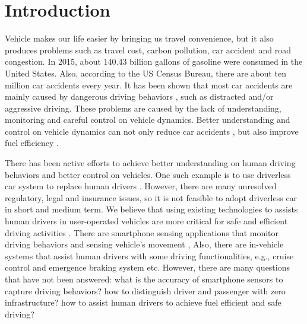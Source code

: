 
\chapter{Introduction}  %


Vehicle makes our life easier by bringing us travel convenience, 
but it also produces problems such as travel cost, carbon pollution, 
car accident and road congestion.
In 2015, about 140.43 billion gallons of gasoline were consumed in the United States. 
Also, according to the US Census Bureau, there are about ten million car accidents every year.
It has been shown that most car accidents are mainly 
caused by dangerous driving behaviors \cite{progressive}, such as distracted and/or aggressive driving.  
These problems are caused by the lack of understanding, monitoring 
and careful control on vehicle dynamics. 
Better understanding and control on vehicle dynamics
can not only reduce car accidents \cite{progressive}, 
but also improve fuel efficiency \cite{morganstanley2013}. 


There has been active efforts to achieve better understanding on
human driving behaviors and better control on vehicles. 
One such example is to use driverless car system to 
replace human drivers \cite{googledriverlesscar, kumar2012carspeak,
urmson2008autonomous,litman2013autonomous}. 
However, there are many unresolved regulatory, legal and insurance issues, 
so it is not feasible to adopt driverless car in short and medium term.   
We believe that using existing technologies to assists human drivers
in user-operated vehicles are more critical for safe and efficient driving activities \cite{you2013carsafe, wang2013sensing, chen2015invisible, uber}. 
There are smartphone sensing applications that 
monitor driving behaviors and sensing vehicle's movement \cite{you2013carsafe, wang2013sensing},
Also, there are in-vehicle systems that assist human drivers with some driving functionalities, 
e.g., cruise control \cite{bengtsson2001adaptive, cruise_control} and emergence braking system \cite{emergency_brake} etc. 
However, there are many questions that have not been answered: 
what is the accuracy of smartphone sensors to capture driving behaviors?
how to distinguish driver and passenger with zero infrastructure?
how to assist human drivers to achieve fuel efficient and safe driving?


